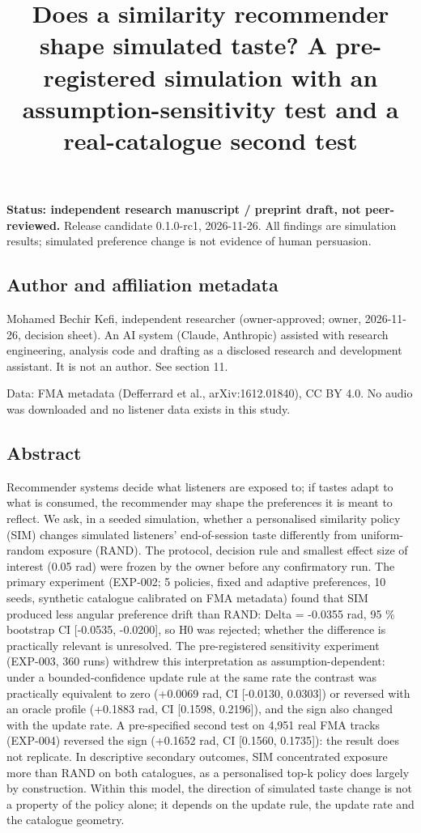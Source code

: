 \documentclass[
]{article}
\title{Does a similarity recommender shape simulated taste? A
pre-registered simulation with an assumption-sensitivity test and a
real-catalogue second test}
\author{}
\date{}
\begin{document}
\maketitle

\textbf{Status: independent research manuscript / preprint draft, not
peer-reviewed.} Release candidate 0.1.0-rc1, 2026-11-26. All findings
are simulation results; simulated preference change is not evidence of
human persuasion.

\subsection{Author and affiliation
metadata}\label{author-and-affiliation-metadata}

Mohamed Bechir Kefi, independent researcher (owner-approved; owner,
2026-11-26, decision sheet). An AI system (Claude, Anthropic) assisted
with research engineering, analysis code and drafting as a disclosed
research and development assistant. It is not an author. See section 11.

Data: FMA metadata (Defferrard et al., arXiv:1612.01840), CC BY 4.0. No
audio was downloaded and no listener data exists in this study.

\subsection{Abstract}\label{abstract}

Recommender systems decide what listeners are exposed to; if tastes
adapt to what is consumed, the recommender may shape the preferences it
is meant to reflect. We ask, in a seeded simulation, whether a
personalised similarity policy (SIM) changes simulated listeners'
end-of-session taste differently from uniform-random exposure (RAND).
The protocol, decision rule and smallest effect size of interest (0.05
rad) were frozen by the owner before any confirmatory run. The primary
experiment (EXP-002; 5 policies, fixed and adaptive preferences, 10
seeds, synthetic catalogue calibrated on FMA metadata) found that SIM
produced less angular preference drift than RAND: Delta = -0.0355 rad,
95 \% bootstrap CI {[}-0.0535, -0.0200{]}, so H0 was rejected; whether
the difference is practically relevant is unresolved. The pre-registered
sensitivity experiment (EXP-003, 360 runs) withdrew this interpretation
as assumption-dependent: under a bounded-confidence update rule at the
same rate the contrast was practically equivalent to zero (+0.0069 rad,
CI {[}-0.0130, 0.0303{]}) or reversed with an oracle profile (+0.1883
rad, CI {[}0.1598, 0.2196{]}), and the sign also changed with the update
rate. A pre-specified second test on 4,951 real FMA tracks (EXP-004)
reversed the sign (+0.1652 rad, CI {[}0.1560, 0.1735{]}): the result
does not replicate. In descriptive secondary outcomes, SIM concentrated
exposure more than RAND on both catalogues, as a personalised top-k
policy does largely by construction. Within this model, the direction of
simulated taste change is not a property of the policy alone; it depends
on the update rule, the update rate and the catalogue geometry.
\end{document}
